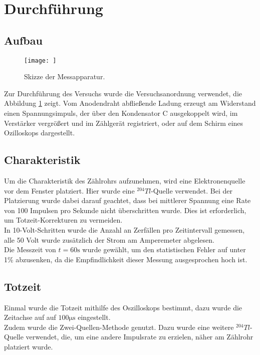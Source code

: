 \section{Durchführung}
\label{sec:Durchführung}

\subsection{Aufbau}
\begin{figure}
 \centering
 \texttt{[image: ]}
 \label{fig:aufbauversuch}
 \caption{Skizze der Messapparatur.}
\end{figure}

\noindent Zur Durchführung des Versuchs wurde die Versuchsanordnung verwendet,
die Abbildung \ref{fig:aufbauversuch} zeigt. Vom Anodendraht abfließende Ladung
erzeugt am Widerstand einen Spannungsimpuls, der über den Kondensator C ausgekoppelt wird,
im Verstärker vergrößert und im Zählgerät registriert, oder auf dem Schirm
eines Ozilloskops dargestellt.\\

\subsection{Charakteristik}
Um die Charakteristik des Zählrohrs aufzunehmen, wird eine Elektronenquelle vor dem
Fenster platziert. Hier wurde eine $^204Tl$-Quelle verwendet. Bei der Platzierung
wurde dabei darauf geachtet, dass bei mittlerer Spannung eine Rate von
100 Impulsen pro Sekunde nicht überschritten wurde. Dies ist erforderlich,
um Totzeit-Korrekturen zu vermeiden. \\
In 10-Volt-Schritten wurde die Anzahl an Zerfällen pro Zeitintervall gemessen, alle 
50 Volt wurde zusätzlich der Strom am Amperemeter abgelesen.\\
Die Messzeit von $t = 60\si{\s}$ wurde gewählt, um den statistischen Fehler
auf unter 1\% abzusenken, da die Empfindlichkeit dieser Messung ausgesprochen
hoch ist. 

\subsection{Totzeit}
Einmal wurde die Totzeit mithilfe des Oszilloskops bestimmt, dazu wurde 
die Zeitachse auf auf $100 \si{\micro\s}$ eingestellt.\\
Zudem wurde die Zwei-Quellen-Methode genutzt. Dazu wurde eine weitere
$^204 Tl$-Quelle verwendet, die, um eine andere Impulsrate zu erzielen,
näher am Zählrohr platziert wurde. 
